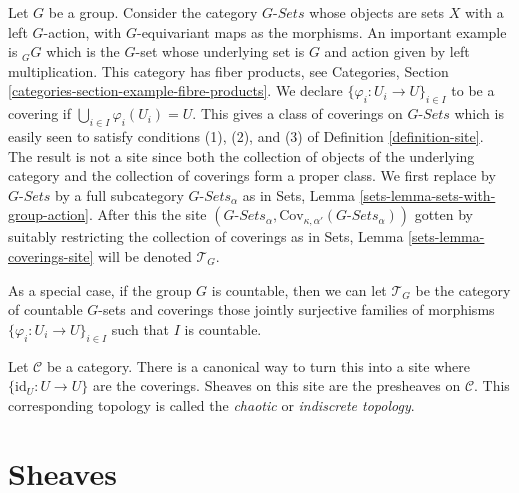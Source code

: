 \begin{example}
\label{example-site-on-group}
Let $G$ be a group. Consider the category $G\textit{-Sets}$
whose objects are sets $X$ with a left $G$-action, with
$G$-equivariant maps as the morphisms. An important example
is ${}_GG$ which is the $G$-set whose underlying set is $G$ and
action given by left multiplication. This category has
fiber products, see Categories, Section
\ref{categories-section-example-fibre-products}.
We declare $\{\varphi_i : U_i \to U\}_{i\in I}$ to be
a covering if $\bigcup_{i\in I} \varphi_i(U_i) = U$.
This gives a class of coverings on $G\textit{-Sets}$
which is easily seen to satisfy conditions (1), (2), and (3)
of Definition \ref{definition-site}. The result is not a
site since both the collection of objects of the underlying category and
the collection of coverings form a proper class.
We first replace by $G\textit{-Sets}$ by a
full subcategory $G\textit{-Sets}_\alpha$ as in Sets,
Lemma \ref{sets-lemma-sets-with-group-action}.
After this the site
$(G\textit{-Sets}_\alpha,
\text{Cov}_{\kappa, \alpha'}(G\textit{-Sets}_\alpha))$
gotten by suitably restricting the collection of coverings
as in Sets, Lemma \ref{sets-lemma-coverings-site} will be
denoted $\mathcal{T}_G$.

\medskip\noindent
As a special case, if the group $G$ is countable, then we can let
$\mathcal{T}_G$ be the category of countable $G$-sets and coverings
those jointly surjective families of morphisms
$\{\varphi_i : U_i \to U\}_{i \in I}$ such that $I$ is countable.
\end{example}

\begin{example}
\label{example-indiscrete}
Let $\mathcal{C}$ be a category. There is a canonical way to turn this
into a site where $\{\text{id}_U : U \to U\}$ are the coverings.
Sheaves on this site are the presheaves on $\mathcal{C}$.
This corresponding topology is called the {\it chaotic} or
{\it indiscrete topology}.
\end{example}















\section{Sheaves}
\label{section-sheaves}

